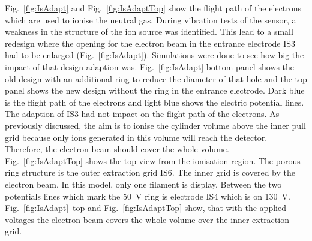 	Fig.~\ref{fig:IsAdapt} and Fig.~\ref{fig:IsAdaptTop} show the flight path of the electrons which are used to ionise the neutral gas. During vibration tests of the sensor, a weakness in the structure of the ion source was identified. This lead to a small redesign where the opening for the electron beam in the entrance electrode IS3 had to be enlarged (Fig.~\ref{fig:IsAdapt}). Simulations were done to see how big the impact of that design adaption was. Fig.~\ref{fig:IsAdapt} bottom panel shows the old design with an additional ring to reduce the diameter of that hole and the top panel shows the new design without the ring in the entrance electrode. Dark blue is the flight path of the electrons and light blue shows the electric potential lines. The adaption of IS3 had not impact on the flight path of the electrons. As previously discussed, the aim is to ionise the cylinder volume above the inner pull grid because only ions generated in this volume will reach the detector. Therefore, the electron beam should cover the whole volume. Fig.~\ref{fig:IsAdaptTop} shows the top view from the ionisation region. The porous ring structure is the outer extraction grid IS6. The inner grid is covered by the electron beam. In this model, only one filament is display. Between the two potentials lines which mark the 50~V ring is electrode IS4 which is on 130~V. Fig.~\ref{fig:IsAdapt}~top and Fig.~\ref{fig:IsAdaptTop} show, that with the applied voltages the electron beam covers the whole volume over the inner extraction grid.
	\newpage
	
	
	
	
